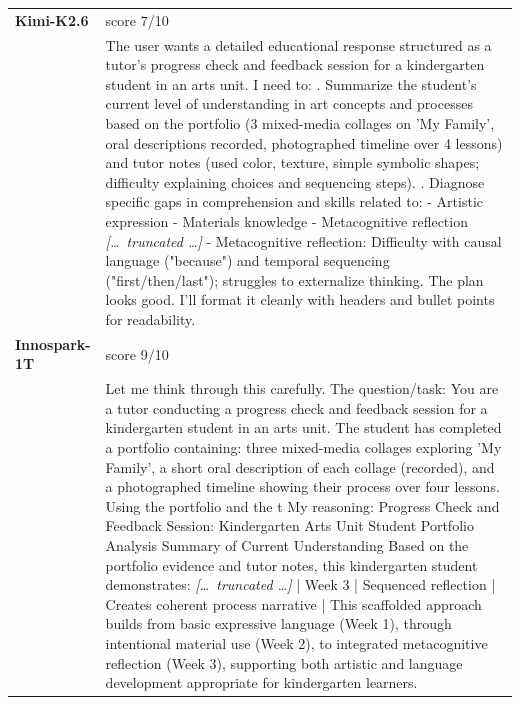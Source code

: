 \begin{longtable}{@{}l p{12.5cm}@{}}
  \midrule
  \textbf{Kimi-K2.6} & score 7/10 \\
  & The user wants a detailed educational response structured as a tutor's progress check and feedback session for a kindergarten student in an arts unit. I need to: \newline 1. Summarize the student's current level of understanding in art concepts and processes based on the portfolio (3 mixed-media collages on 'My Family', oral descriptions recorded, photographed timeline over 4 lessons) and tutor notes (used color, texture, simple symbolic shapes; difficulty explaining choices and sequencing steps). \newline 2. Diagnose specific gaps in comprehension and skills related to: \newline - Artistic expression \newline - Materials knowledge \newline - Metacognitive reflection \newline \textit{[\ldots\ truncated \ldots]} \newline - Metacognitive reflection: Difficulty with causal language ("because") and temporal sequencing ("first/then/last"); struggles to externalize thinking. \newline The plan looks good. I'll format it cleanly with headers and bullet points for readability. \\
  \textbf{Innospark-1T} & score 9/10 \\
  & Let me think through this carefully. \newline The question/task: You are a tutor conducting a progress check and feedback session for a kindergarten student in an arts unit. The student has completed a portfolio containing: three mixed-media collages exploring 'My Family', a short oral description of each collage (recorded), and a photographed timeline showing their process over four lessons. Using the portfolio and the t \newline My reasoning: Progress Check and Feedback Session: Kindergarten Arts Unit \newline Student Portfolio Analysis \newline Summary of Current Understanding \newline Based on the portfolio evidence and tutor notes, this kindergarten student demonstrates: \newline \textit{[\ldots\ truncated \ldots]} \newline | Week 3 | Sequenced reflection | Creates coherent process narrative | \newline This scaffolded approach builds from basic expressive language (Week 1), through intentional material use (Week 2), to integrated metacognitive reflection (Week 3), supporting both artistic and language development appropriate for kindergarten learners. \\

\end{longtable}
